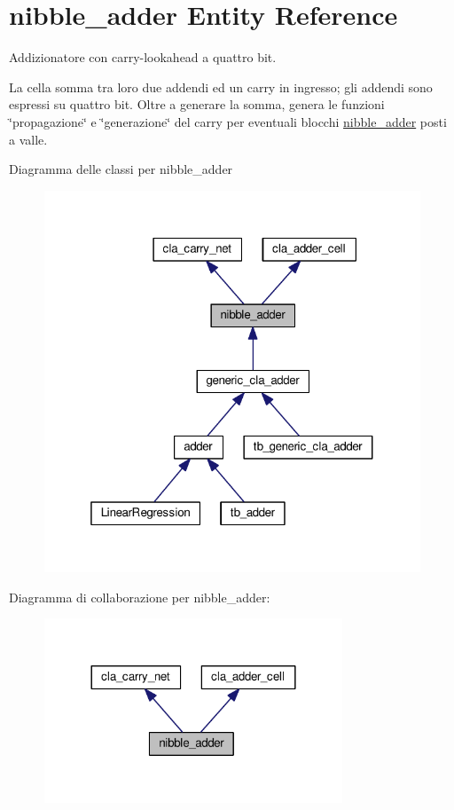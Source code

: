 \hypertarget{classnibble__adder}{}\section{nibble\+\_\+adder Entity Reference}
\label{classnibble__adder}


Addizionatore con carry-\/lookahead a quattro bit.

La cella somma tra loro due addendi ed un carry in ingresso; gli addendi sono espressi su quattro bit. Oltre a generare la somma, genera le funzioni \char`\"{}propagazione\char`\"{} e \char`\"{}generazione\char`\"{} del carry per eventuali blocchi \hyperlink{classnibble__adder}{nibble\+\_\+adder} posti a valle.  




Diagramma delle classi per nibble\+\_\+adder
\nopagebreak
\begin{figure}[H]
\begin{center}
\leavevmode
\includegraphics[width=319pt]{classnibble__adder__inherit__graph}
\end{center}
\end{figure}


Diagramma di collaborazione per nibble\+\_\+adder\+:
\nopagebreak
\begin{figure}[H]
\begin{center}
\leavevmode
\includegraphics[width=252pt]{classnibble__adder__coll__graph}
\end{center}
\end{figure}

